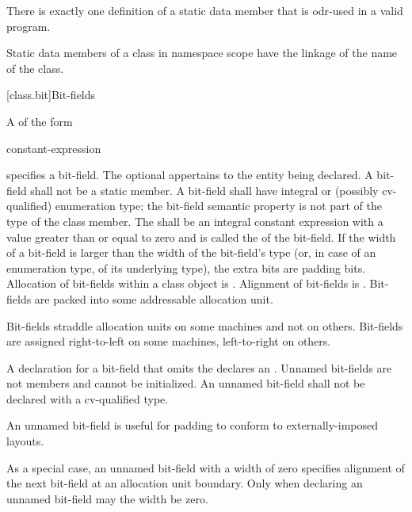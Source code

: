 \pnum
\begin{note}
There is exactly one definition of a static data member
that is odr-used in a valid program.
\end{note}

\pnum
\begin{note}
Static data members of a class in namespace scope have the linkage of the name of the class.
\end{note}

[class.bit]{Bit-fields}%

\pnum
A  of the form
\begin{ncsimplebnf}
  \terminal{:} constant-expression 
\end{ncsimplebnf}
%
%
specifies a bit-field.
The optional  appertains
to the entity being declared.
A bit-field shall not be a static member.
%
A bit-field shall have integral or (possibly cv-qualified) enumeration type;
the bit-field semantic property is not part of the type of the class member.
The  shall be an integral constant expression
with a value greater than or equal to zero and
is called the  of the bit-field.
If the width of a bit-field is larger than
the width of the bit-field's type
(or, in case of an enumeration type, of its underlying type),
the extra bits are padding bits.
%
Allocation of bit-fields within a class object is
.
%
Alignment of bit-fields is .
%
Bit-fields are packed into some addressable allocation unit.
\begin{note}
Bit-fields straddle allocation units on some machines and not on others.
Bit-fields are assigned right-to-left on some machines, left-to-right on
others.
\end{note}

\pnum
A declaration for a bit-field that omits the 
declares an . Unnamed bit-fields are not
members and cannot be initialized.
An unnamed bit-field shall not be declared with a cv-qualified type.
\begin{note}
An unnamed bit-field is useful for padding to conform to
externally-imposed layouts.
\end{note}
%
%
As a special case, an unnamed bit-field with a width of zero specifies
alignment of the next bit-field at an allocation unit boundary. Only
when declaring an unnamed bit-field may the width be zero.

